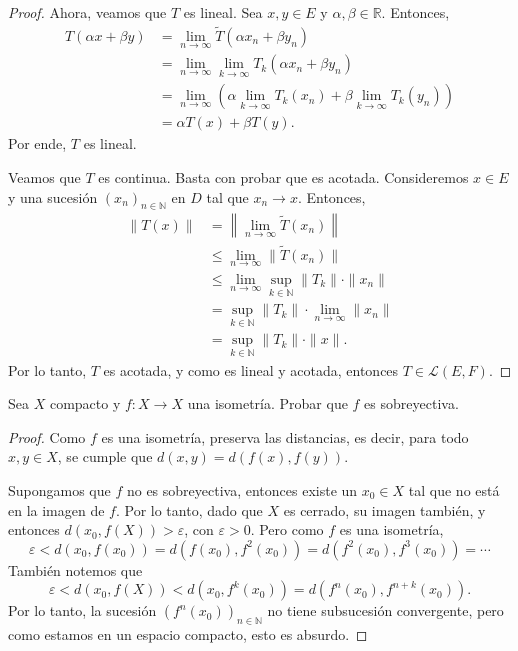 \begin{proof}
    Ahora, veamos que $T$ es lineal. Sea $x, y \in E$ y $\alpha, \beta \in \mathbb{R}$. Entonces,
    \begin{align*}
        T(\alpha x + \beta y) &= \lim_{n \to \infty} \widetilde{T}(\alpha x_n + \beta y_n) \\
        &= \lim_{n \to \infty} \lim_{k \to \infty} T_k(\alpha x_n + \beta y_n) \\
        &= \lim_{n \to \infty} (\alpha \lim_{k \to \infty} T_k(x_n) + \beta \lim_{k \to \infty} T_k(y_n)) \\
        &= \alpha T(x) + \beta T(y).
    \end{align*}
    Por ende, $T$ es lineal.

    Veamos que $T$ es continua. Basta con probar que es acotada. Consideremos $x \in E$ y una sucesión $(x_n)_{n \in \mathbb{N}}$ en $D$ tal que $x_n \to x$. Entonces,
    \begin{align*}
        \| T(x) \| &= \left\| \lim_{n \to \infty} \widetilde{T}(x_n) \right\| \\
        &\leq \lim_{n \to \infty} \| \widetilde{T}(x_n) \| \\
        &\leq \lim_{n \to \infty} \sup_{k \in \mathbb{N}} \| T_k \| \cdot \| x_n \| \\
        &= \sup_{k \in \mathbb{N}} \| T_k \| \cdot \lim_{n \to \infty} \| x_n \| \\
        &= \sup_{k \in \mathbb{N}} \| T_k \| \cdot \| x \|.
    \end{align*}
    Por lo tanto, $T$ es acotada, y como es lineal y acotada, entonces $T \in \mathcal{L}(E, F)$.
\end{proof}

\begin{exercise}
    Sea $X$ compacto y $f : X \to X$ una isometría. Probar que $f$ es sobreyectiva.
\end{exercise}

\begin{proof}
    Como $f$ es una isometría, preserva las distancias, es decir, para todo $x, y \in X$, se cumple que $d(x, y) = d(f(x), f(y))$.

    Supongamos que $f$ no es sobreyectiva, entonces existe un $x_0 \in X$ tal que no está en la imagen de $f$. Por lo tanto, dado que $X$ es cerrado, su imagen también, y entonces $d(x_0, f(X)) > \varepsilon$, con $\varepsilon > 0$. Pero como $f$ es una isometría,
    \begin{equation*}
        \varepsilon < d(x_0, f(x_0)) = d(f(x_0), f^2(x_0)) = d(f^2(x_0), f^3(x_0)) = \cdots
    \end{equation*}
    También notemos que 
    \begin{equation*}
        \varepsilon < d(x_0, f(X)) < d(x_0, f^k(x_0)) = d(f^n(x_0), f^{n + k}(x_0)).
    \end{equation*}
    Por lo tanto, la sucesión $(f^n(x_0))_{n \in \mathbb{N}}$ no tiene subsucesión convergente, pero como estamos en un espacio compacto, esto es absurdo.
\end{proof}

